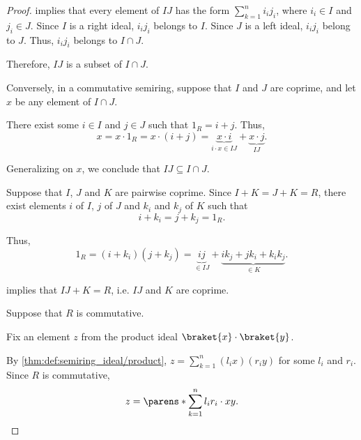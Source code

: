 \begin{proof}
   implies that every element of \( IJ \) has the form \( \sum_{k=1}^n i_i j_i \), where \( i_i \in I \) and \( j_i \in J \). Since \( I \) is a right ideal, \( i_i j_i \) belongs to \( I \). Since \( J \) is a left ideal, \( i_i j_i \) belong to \( J \). Thus, \( i_i j_i \) belongs to \( I \cap J \).

  Therefore, \( IJ \) is a subset of \( I \cap J \).

  \NecessitySubProof* Conversely, in a commutative semiring, suppose that \( I \) and \( J \) are coprime, and let \( x \) be any element of \( I \cap J \).

  There exist some \( i \in I \) and \( j \in J \) such that \( 1_R = i + j \). Thus,
  \begin{equation*}
    x = x \cdot 1_R = x \cdot (i + j) = \underbrace{x \cdot i}_{i \cdot x \in IJ} + \underbrace{x \cdot j}_{IJ}.
  \end{equation*}

  Generalizing on \( x \), we conclude that \( IJ \subseteq I \cap J \).

   Suppose that \( I \), \( J \) and \( K \) are pairwise coprime. Since \( I + K = J + K = R \), there exist elements \( i \) of \( I \), \( j \) of \( J \) and \( k_i \) and \( k_j \) of \( K \) such that
  \begin{equation*}
    i + k_i = j + k_j = 1_R.
  \end{equation*}

  Thus,
  \begin{equation*}
    1_R = (i + k_i)(j + k_j) = \underbrace{ij}_{\in IJ} + \underbrace{i k_j + j k_i + k_i k_j}_{\in K}.
  \end{equation*}

   implies that \( IJ + K = R \), i.e. \( IJ \) and \( K \) are coprime.

   Suppose that \( R \) is commutative.

  \SufficiencySubProof* Fix an element \( z \) from the product ideal \( \braket{x} \cdot \braket{y} \).

  By \cref{thm:def:semiring_ideal/product}, \( z = \sum_{k=1}^n (l_i x) (r_i y) \) for some \( l_i \) and \( r_i \). Since \( R \) is commutative,
  \begin{equation*}
    z = \parens*{ \sum_{k=1}^n l_i r_i } \cdot xy.
  \end{equation*}


\end{proof}
